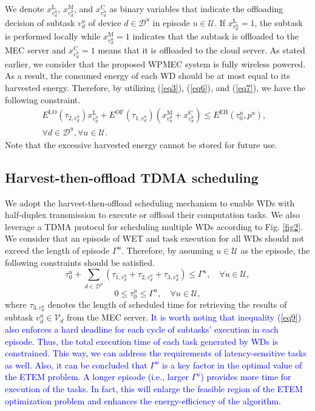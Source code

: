 \documentclass[12pt,draftclsnofoot,onecolumn]{IEEEtran}
\begin{document}
We denote $x^{\text{L}}_{v_d^u}$, $x^{\text{M}}_{v_d^u}$, and $x^{\text{C}}_{v_d^u}$ as binary variables that indicate the offloading decision of subtask $v_d^u$ of device $d\in\mathcal{D}^u$ in episode $u\in\mathcal{U}$. If $x^{\text{L}}_{v_d^u}=1$, the subtask is performed locally while $x^{\text{M}}_{v_d^u}=1$ indicates that the subtask is offloaded to the MEC server and $x^{\text{C}}_{v_d^u}=1$ means that it is offloaded to the cloud server. As stated earlier, we consider that the proposed WPMEC system is fully wireless powered. As a result, the consumed energy of each WD should be at most equal to its harvested energy. Therefore, by utilizing (\ref{eq3}), (\ref{eq6}), and (\ref{eq7}), we have the following constraint.
\begin{equation}\label{eq8}
	\begin{aligned}
		E^{\text{LO}}(\tau_{2,v_d^u})x^{\text{L}}_{v_d^u} + E^{\text{OF}}(\tau_{1,v_d^u})\left(x^{\text{M}}_{v_d^u}+x^{\text{C}}_{v_d^u}\right) \leq E^{\text{EH}}(\tau_0^u,p^u),& \\
		\forall d\in\mathcal{D}^u, \forall u\in\mathcal{U}.&
	\end{aligned}
\end{equation}
Note that the excessive harvested energy cannot be stored for future use.

\subsection{Harvest-then-offload TDMA scheduling}
We adopt the harvest-then-offload scheduling mechanism to enable WDs with half-duplex transmission to execute or offload their computation tasks. We also leverage a TDMA protocol for scheduling multiple WDs according to Fig. \ref{fig2}. We consider that an episode of WET and task execution for all WDs should not exceed the length of episode $\Gamma^u$. Therefore, by assuming $u\in\mathcal{U}$ as the episode, the following constraints should be satisfied.
\begin{equation}\label{eq9}
	\tau_0^u + \sum_{d\in\mathcal{D}^u}\left(\tau_{1,v_d^u} +\tau_{2,v_d^u}+\tau_{3,v_d^u}\right) \leq \Gamma^u,\quad\forall u\in\mathcal{U},
\end{equation}
\begin{equation}\label{eq9_1}
	0\leq\tau_0^u\leq\Gamma^u,\quad\forall u\in\mathcal{U},
\end{equation}
where $\tau_{3,v_d^u}$ denotes the length of scheduled time for retrieving the results of subtask $v_d^u\in\mathcal{V}_d$ from the MEC server. \textcolor{blue}{It is worth noting that inequality (\ref{eq9}) also enforces a hard deadline for each cycle of subtasks' execution in each episode. Thus, the total execution time of each task generated by WDs is constrained. This way, we can address the requirements of latency-sensitive tasks as well. Also, it can be concluded that $\Gamma^u$ is a key factor in the optimal value of the ETEM problem. A longer episode (i.e., larger $\Gamma^u$) provides more time for execution of the tasks. In fact, this will enlarge the feasible region of the ETEM optimization problem and enhances the energy-efficiency of the algorithm.}
\end{document}
